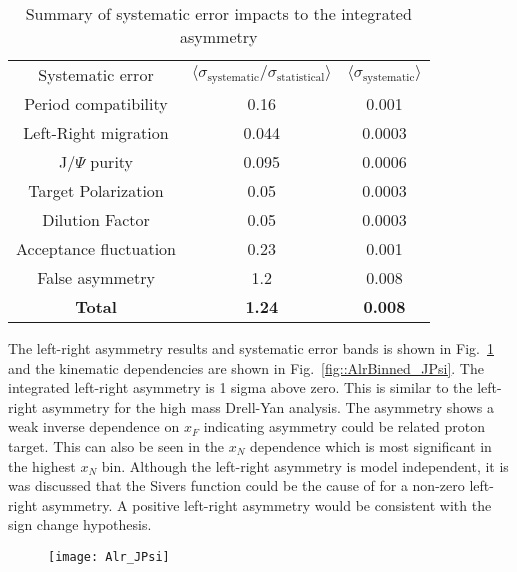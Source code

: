 \begin{table}[h!t]
  \centering
  \begin{tabular}{|c|c|c|}
    \hline
    \multirow{2}{*}{Systematic error}&
    \multirow{2}{*}{
      $\langle \sigma_{\mathrm{systematic}}/\sigma_{\mathrm{statistical}}
      \rangle$} &
    \multirow{2}{*}{$\langle \sigma_{\mathrm{systematic}} \rangle$}\\
    & & \\ \hline \hline

    Period compatibility& 0.16& 0.001\\ \hline

    Left-Right migration& 0.044& 0.0003\\ \hline

    J/$\Psi$ purity& 0.095& 0.0006\\ \hline

    Target Polarization& 0.05& 0.0003\\ \hline

    Dilution Factor& 0.05& 0.0003\\ \hline

    Acceptance fluctuation& 0.23 & 0.001\\ \hline

    False asymmetry& 1.2 & 0.008\\ \hline \hline
    \textbf{Total}& \textbf{1.24} & \textbf{0.008}\\\hline
    
  \end{tabular}
  \caption{Summary of systematic error impacts to the integrated asymmetry}
  \label{tab::sysErrorJPsi}
\end{table}

The left-right asymmetry results and systematic error bands is shown in
Fig.~\ref{fig::Alr_JPsi} and the kinematic dependencies are shown in
Fig.~\ref{fig::AlrBinned_JPsi}.  The integrated left-right asymmetry is 1 sigma
above zero.  This is similar to the left-right asymmetry for the high mass
Drell-Yan analysis.  The asymmetry shows a weak inverse dependence on $x_F$
indicating asymmetry could be related proton target.  This can also be seen in
the $x_N$ dependence which is most significant in the highest $x_N$ bin.
Although the left-right asymmetry is model independent, it is was discussed that
the Sivers function could be the cause of for a non-zero left-right asymmetry.
A positive left-right asymmetry would be consistent with the sign change
hypothesis.

\begin{figure}[h!t]
  \centering
  \texttt{[image: Alr\_JPsi]}
  \caption{}
  \label{fig::Alr_JPsi}
\end{figure}

